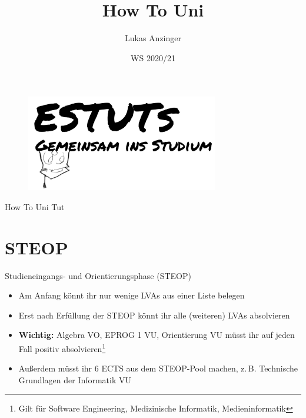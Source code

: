 \documentclass{beamer}
\title{How To Uni}
\date{WS 2020/21}
\author{Lukas Anzinger}
\begin{document}
\begin{frame}
    \begin{figure}[htp]
        \centering
        \includegraphics[width=0.75\textwidth]{eule_text.png}
    \end{figure}
    \maketitle
\end{frame}

\begin{frame}{How To Uni Tut}
    \setcounter{tocdepth}{1}
    \tableofcontents
\end{frame}


\section{STEOP}
\begin{frame}{Studieneingangs- und Orientierungsphase (STEOP)}
    \begin{itemize}
        \item Am Anfang könnt ihr nur wenige LVAs aus einer Liste belegen
        \item Erst nach Erfüllung der STEOP könnt ihr alle (weiteren) LVAs
              absolvieren
        \item \textbf{Wichtig:} Algebra VO, EPROG 1 VU, Orientierung VU
            müsst ihr auf jeden Fall positiv absolvieren\footnote{Gilt für Software Engineering, Medizinische Informatik, Medieninformatik}
        \item Außerdem müsst ihr 6 ECTS aus dem STEOP-Pool machen,
              z.\,B. Technische Grundlagen der Informatik VU
    \end{itemize}
\end{frame}
\end{document}
